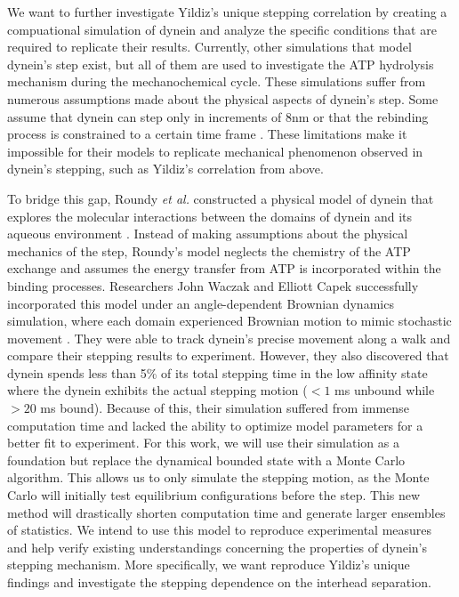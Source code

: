 We want to further investigate Yildiz's unique stepping correlation by creating a compuational simulation of dynein and analyze the specific conditions that are required to replicate their results. Currently, other simulations that model dynein's step exist, but all of them are used to investigate the ATP hydrolysis mechanism during the mechanochemical cycle. These simulations suffer from numerous assumptions made about the physical aspects of dynein's step. Some assume that dynein can step only in increments of 8nm or that the rebinding process is constrained to a certain time frame \cite{singh2005monte, trott2018mathematical}. These limitations make it impossible for their models to replicate mechanical phenomenon observed in dynein's stepping, such as Yildiz's correlation from above.

To bridge this gap, Roundy \textit{et al.} constructed a physical model of dynein that explores the molecular interactions between the domains of dynein and its aqueous environment \cite{Capek2017, waczak2019drunken}. Instead of making assumptions about the physical mechanics of the step, Roundy's model neglects the chemistry of the ATP exchange and assumes the energy transfer from ATP is incorporated within the binding processes. Researchers John Waczak and Elliott Capek successfully incorporated this model under an angle-dependent Brownian dynamics simulation, where each domain experienced Brownian motion to mimic stochastic movement \cite{Capek2017, }. They were able to track dynein's precise movement along a walk and compare their stepping results to experiment. However, they also discovered that dynein spends less than 5\% of its total stepping time in the low affinity state where the dynein exhibits the actual stepping motion ($<1$ ms unbound while $>20$ ms bound). Because of this, their simulation suffered from immense computation time and lacked the ability to optimize model parameters for a better fit to experiment. For this work, we will use their simulation as a foundation but replace the dynamical bounded state with a Monte Carlo algorithm. This allows us to only simulate the stepping motion, as the Monte Carlo will initially test equilibrium configurations before the step. This new method will drastically shorten computation time and generate larger ensembles of statistics. We intend to use this model to reproduce experimental measures and help verify existing understandings concerning the properties of dynein’s stepping mechanism. More specifically, we want reproduce Yildiz's unique findings and investigate the stepping dependence on the interhead separation. 



